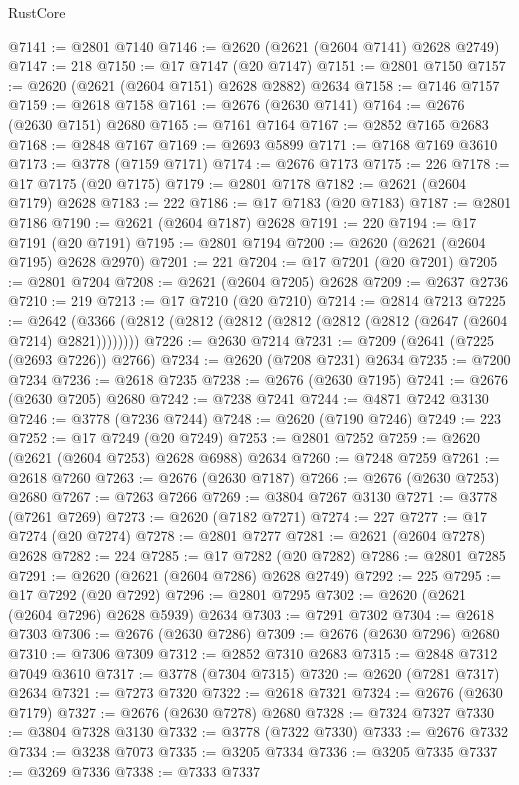 \begin{lexlean}{RustCore}
\begin{coremodule}
@7141 := @2801 @7140
@7146 := @2620 (@2621 (@2604 @7141) @2628 @2749)
@7147 := 218
@7150 := @17 @7147 (@20 @7147)
@7151 := @2801 @7150
@7157 := @2620 (@2621 (@2604 @7151) @2628 @2882) @2634
@7158 := @7146 @7157
@7159 := @2618 @7158
@7161 := @2676 (@2630 @7141)
@7164 := @2676 (@2630 @7151) @2680
@7165 := @7161 @7164
@7167 := @2852 @7165 @2683
@7168 := @2848 @7167
@7169 := @2693 @5899
@7171 := @7168 @7169 @3610
@7173 := @3778 (@7159 @7171)
@7174 := @2676 @7173
@7175 := 226
@7178 := @17 @7175 (@20 @7175)
@7179 := @2801 @7178
@7182 := @2621 (@2604 @7179) @2628
@7183 := 222
@7186 := @17 @7183 (@20 @7183)
@7187 := @2801 @7186
@7190 := @2621 (@2604 @7187) @2628
@7191 := 220
@7194 := @17 @7191 (@20 @7191)
@7195 := @2801 @7194
@7200 := @2620 (@2621 (@2604 @7195) @2628 @2970)
@7201 := 221
@7204 := @17 @7201 (@20 @7201)
@7205 := @2801 @7204
@7208 := @2621 (@2604 @7205) @2628
@7209 := @2637 @2736
@7210 := 219
@7213 := @17 @7210 (@20 @7210)
@7214 := @2814 @7213
@7225 := @2642 (@3366 (@2812 (@2812 (@2812 (@2812 (@2812 (@2812 (@2647 (@2604 @7214) @2821))))))))
@7226 := @2630 @7214
@7231 := @7209 (@2641 (@7225 (@2693 @7226)) @2766)
@7234 := @2620 (@7208 @7231) @2634
@7235 := @7200 @7234
@7236 := @2618 @7235
@7238 := @2676 (@2630 @7195)
@7241 := @2676 (@2630 @7205) @2680
@7242 := @7238 @7241
@7244 := @4871 @7242 @3130
@7246 := @3778 (@7236 @7244)
@7248 := @2620 (@7190 @7246)
@7249 := 223
@7252 := @17 @7249 (@20 @7249)
@7253 := @2801 @7252
@7259 := @2620 (@2621 (@2604 @7253) @2628 @6988) @2634
@7260 := @7248 @7259
@7261 := @2618 @7260
@7263 := @2676 (@2630 @7187)
@7266 := @2676 (@2630 @7253) @2680
@7267 := @7263 @7266
@7269 := @3804 @7267 @3130
@7271 := @3778 (@7261 @7269)
@7273 := @2620 (@7182 @7271)
@7274 := 227
@7277 := @17 @7274 (@20 @7274)
@7278 := @2801 @7277
@7281 := @2621 (@2604 @7278) @2628
@7282 := 224
@7285 := @17 @7282 (@20 @7282)
@7286 := @2801 @7285
@7291 := @2620 (@2621 (@2604 @7286) @2628 @2749)
@7292 := 225
@7295 := @17 @7292 (@20 @7292)
@7296 := @2801 @7295
@7302 := @2620 (@2621 (@2604 @7296) @2628 @5939) @2634
@7303 := @7291 @7302
@7304 := @2618 @7303
@7306 := @2676 (@2630 @7286)
@7309 := @2676 (@2630 @7296) @2680
@7310 := @7306 @7309
@7312 := @2852 @7310 @2683
@7315 := @2848 @7312 @7049 @3610
@7317 := @3778 (@7304 @7315)
@7320 := @2620 (@7281 @7317) @2634
@7321 := @7273 @7320
@7322 := @2618 @7321
@7324 := @2676 (@2630 @7179)
@7327 := @2676 (@2630 @7278) @2680
@7328 := @7324 @7327
@7330 := @3804 @7328 @3130
@7332 := @3778 (@7322 @7330)
@7333 := @2676 @7332
@7334 := @3238 @7073
@7335 := @3205 @7334
@7336 := @3205 @7335
@7337 := @3269 @7336
@7338 := @7333 @7337

\end{coremodule}
\end{lexlean}
